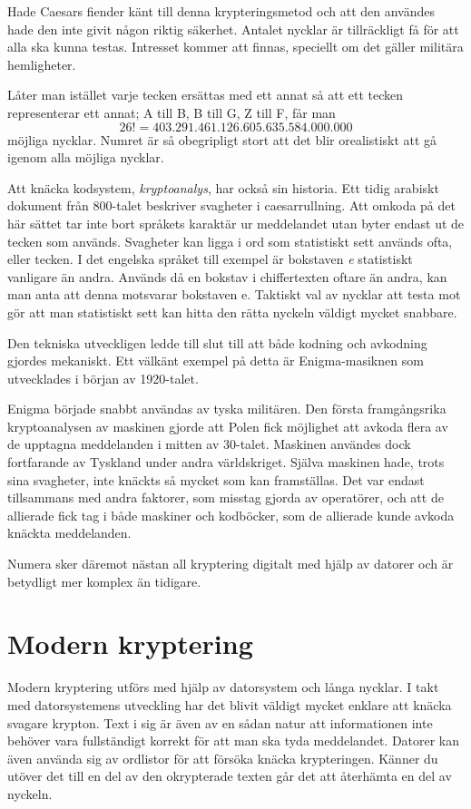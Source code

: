 \documentclass{article}
\begin{document}
Hade Caesars fiender känt till denna krypteringsmetod och att den användes hade den inte givit någon riktig säkerhet. Antalet nycklar är tillräckligt få för att alla ska kunna testas. Intresset kommer att finnas, speciellt om det gäller militära hemligheter.

Låter man istället varje tecken ersättas med ett annat så att ett tecken representerar ett annat; A till B, B till G, Z till F,  får man \[26! = 403.291.461.126.605.635.584.000.000\] möjliga nycklar. Numret är så obegripligt stort att det blir orealistiskt att gå igenom alla möjliga nycklar.

Att knäcka kodsystem, \emph{kryptoanalys}, har också sin historia. Ett tidig arabiskt dokument från 800-talet beskriver svagheter i caesarrullning. Att omkoda på det här sättet tar inte bort språkets karaktär ur meddelandet utan byter endast ut de tecken som används. Svagheter kan ligga i ord som statistiskt sett används ofta, eller tecken. I det engelska språket till exempel är bokstaven \emph{e} statistiskt vanligare än andra. Används då en bokstav i chiffertexten oftare än andra, kan man anta att denna motsvarar bokstaven e. Taktiskt val av nycklar att testa mot gör att man statistiskt sett kan hitta den rätta nyckeln väldigt mycket snabbare.

Den tekniska utveckligen ledde till slut till att både kodning och avkodning gjordes mekaniskt. Ett välkänt exempel på detta är Enigma-masiknen som utvecklades i början av 1920-talet.

Enigma började snabbt användas av tyska militären. Den första framgångsrika kryptoanalysen av maskinen gjorde att Polen fick möjlighet att avkoda flera av de upptagna meddelanden i mitten av 30-talet. Maskinen användes dock fortfarande av Tyskland under andra världskriget. Själva maskinen hade, trots sina svagheter, inte knäckts så mycket som kan framställas. Det var endast tillsammans med andra faktorer, som misstag gjorda av operatörer, och att de allierade fick tag i både maskiner och kodböcker, som de allierade kunde avkoda knäckta meddelanden.

Numera sker däremot nästan all kryptering digitalt med hjälp av datorer och är betydligt mer komplex än tidigare.\newline

\section {Modern kryptering}

Modern kryptering utförs med hjälp av datorsystem och långa nycklar. I takt med datorsystemens utveckling har det blivit väldigt mycket enklare att knäcka svagare krypton. Text i sig är även av en sådan natur att informationen inte behöver vara fullständigt korrekt för att man ska tyda meddelandet. Datorer kan även använda sig av ordlistor för att försöka knäcka krypteringen. Känner du utöver det till en del av den okrypterade texten går det att återhämta en del av nyckeln.
\end{document}

